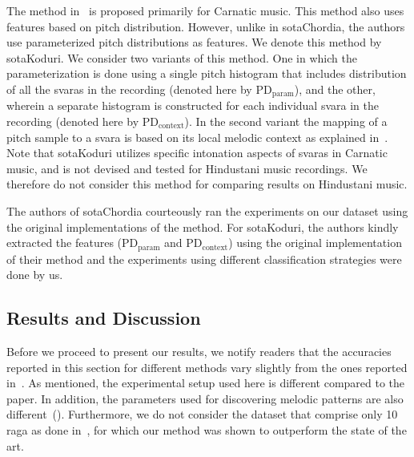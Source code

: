 The method in~\cite{koduri2014intonation} is proposed primarily for Carnatic music. This method also uses features based on pitch distribution. However, unlike in \acrshort{sotaChordia}, the authors use parameterized pitch distributions as features. We denote this method by \acrshort{sotaKoduri}. We consider two variants of this method. One in which the parameterization is done using a single pitch histogram that includes distribution of all the \glspl{svara} in the recording (denoted here by $\mathrm{PD}_\mathrm{param}$), and the other, wherein a separate histogram is constructed for each individual \gls{svara} in the recording (denoted here by $\mathrm{PD}_\mathrm{context}$). In the second variant the mapping of a pitch sample to a \gls{svara} is based on its local melodic context as explained in~\cite{koduri2014intonation}. Note that \acrshort{sotaKoduri} utilizes specific intonation aspects of \glspl{svara} in Carnatic music, and is not devised and tested for Hindustani music recordings. We therefore do not consider this method for comparing results on Hindustani music. 

The authors of \acrshort{sotaChordia} courteously ran the experiments on our dataset using the original implementations of the method. For \acrshort{sotaKoduri}, the authors kindly extracted the features ($\mathrm{PD}_\mathrm{param}$ and $\mathrm{PD}_\mathrm{context}$) using the original implementation of their method and the experiments using different classification strategies were done by us.


\subsection{Results and Discussion}
\label{sec:vsm_eval_results}

Before we proceed to present our results, we notify readers that the accuracies reported in this section for different methods vary slightly from the ones reported in~\cite{gulatiphrase_2016}. As mentioned, the experimental setup used here is different compared to the paper. In addition, the parameters used for discovering melodic patterns are also different~(). Furthermore, we do not consider the dataset that comprise only 10\,\gls{raga} as done in~\cite{gulatiphrase_2016}, for which our method was shown to outperform the state of the art. 

